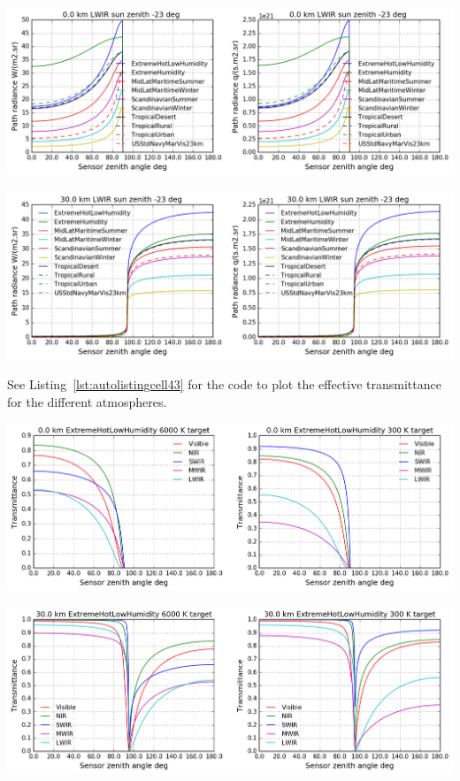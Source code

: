 \documentclass{workpackage}
\begin{document}
\begin{center}
\includegraphics{./pic/Analyse-Standard-Atmospheres_42_8.png}
\end{center}

\begin{center}
\includegraphics{./pic/Analyse-Standard-Atmospheres_42_9.png}
\end{center}



See Listing~\ref{lst:autolistingcell43} for the code to plot the effective transmittance for the different atmospheres.

\begin{center}
\includegraphics{./pic/Analyse-Standard-Atmospheres_43_0.png}
\end{center}

\begin{center}
\includegraphics{./pic/Analyse-Standard-Atmospheres_43_1.png}
\end{center}
\end{document}
